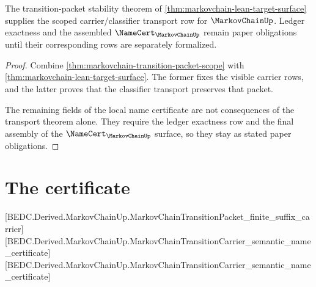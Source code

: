 \begin{theorem}
\label{thm:markovchain-scoped-obligation-package}
The transition-packet stability theorem of
\autoref{thm:markovchain-lean-target-surface} supplies the scoped
carrier/classifier transport row for $\MarkovChainUp$. Ledger exactness and the
assembled $\NameCert_{\MarkovChainUp}$ remain paper obligations until their
corresponding rows are separately formalized.
\end{theorem}
\begin{proof}
Combine \autoref{thm:markovchain-transition-packet-scope} with
\autoref{thm:markovchain-lean-target-surface}. The former fixes the visible
carrier rows, and the latter proves that the classifier transport preserves
that packet.

The remaining fields of the local name certificate are not consequences of the
transport theorem alone. They require the ledger exactness row and the final
assembly of the $\NameCert_{\MarkovChainUp}$ surface, so they stay as stated
paper obligations.
\end{proof}

\section{The certificate}
\label{sec:markovchain-certificate}

[BEDC.Derived.MarkovChainUp.MarkovChainTransitionPacket\_finite\_suffix\_carrier]
[BEDC.Derived.MarkovChainUp.MarkovChainTransitionCarrier\_semantic\_name\_certificate]
[BEDC.Derived.MarkovChainUp.MarkovChainTransitionCarrier\_semantic\_name\_certificate]

